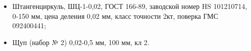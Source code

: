 \begin{itemize}
\item 	
Штангенциркуль, ШЦ-1-0,02, ГОСТ 166-89, заводской номер HS 101210714, 0-150 мм, цена деления 0,02 мм, класс точности 2кт, поверка ГМС 092400441;
\item 	
Щуп (набор № 2) 0,02-0,5 мм, 100 мм, кл 2.
%
%	
\end{itemize}
